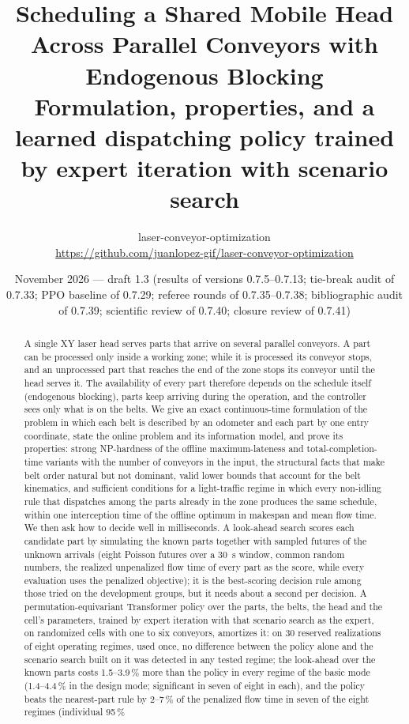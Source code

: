\documentclass[11pt,a4paper]{article}
\title{\textbf{Scheduling a Shared Mobile Head Across Parallel Conveyors with Endogenous Blocking}\\[0.3em]
\large Formulation, properties, and a learned dispatching policy trained by expert iteration with scenario search}
\author{laser-conveyor-optimization\\\small\url{https://github.com/juanlopez-gif/laser-conveyor-optimization}}
\date{November 2026 --- draft 1.3 (results of versions 0.7.5--0.7.13; tie-break audit of 0.7.33; PPO baseline of 0.7.29; referee rounds of 0.7.35--0.7.38; bibliographic audit of 0.7.39; scientific review of 0.7.40; closure review of 0.7.41)}
\theoremstyle{plain}
\theoremstyle{definition}
\theoremstyle{remark}
\begin{document}
\maketitle

\begin{abstract}
A single XY laser head serves parts that arrive on several parallel conveyors. A part can
be processed only inside a working zone; while it is processed its conveyor stops, and an
unprocessed part that reaches the end of the zone stops its conveyor until the head serves
it. The availability of every part therefore depends on the schedule itself (endogenous
blocking), parts keep arriving during the operation, and the controller sees only what is
on the belts. We give an exact continuous-time formulation of the problem in which each
belt is described by an odometer and each part by one entry coordinate, state the online
problem and its information model, and prove its properties: strong NP-hardness of the
offline maximum-lateness and total-completion-time variants with the number of conveyors
in the input, the structural facts that make belt order natural but
not dominant, valid lower bounds that account for the belt kinematics, and sufficient
conditions for a light-traffic regime in which every non-idling rule that dispatches
among the parts already in the zone produces the same schedule, within one interception
time of the offline optimum in makespan and mean flow time. We then ask how to decide well in
milliseconds. A look-ahead search scores each candidate part by simulating the known parts
together with sampled futures of the unknown arrivals (eight Poisson futures over a 30~s
window, common random numbers, the realized unpenalized flow time of every part as the
score, while every evaluation uses the penalized objective); it is
the best-scoring decision rule among those tried on the development groups, but it needs about a second per decision. A
permutation-equivariant Transformer policy over the parts, the belts, the head and the cell's
parameters, trained by expert iteration with that scenario search as the expert, on
randomized cells with one to six conveyors, amortizes it: on 30 reserved realizations of
eight operating regimes, used once, no difference between the policy alone and the
scenario search built on it was detected in any tested regime; the look-ahead over the known parts costs
1.5--3.9\,\% more than the policy in every regime of the basic mode (1.4--4.4\,\% in the design mode; significant in seven of eight in each), and the policy beats the nearest-part rule
by 2--7\,\% of the penalized flow time in seven of the eight regimes (individual 95\,\%

\end{abstract}
\end{document}
